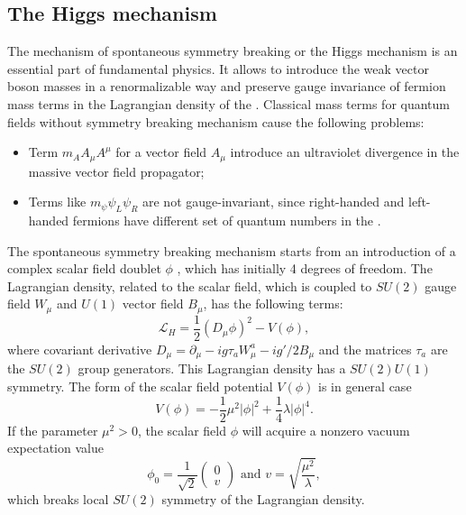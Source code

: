 \subsection{The Higgs mechanism}
\label{sec:Higgs_SM}
The mechanism of spontaneous symmetry breaking or the Higgs mechanism is an essential part of fundamental physics. It allows to introduce the weak vector boson masses in a renormalizable way and preserve gauge invariance of fermion mass terms in the Lagrangian density of the \sm. Classical mass terms for quantum fields without symmetry breaking mechanism cause the following problems:
\begin{itemize}
\item Term $m_A A_\mu A^\mu$ for a vector field $A_\mu$ introduce an ultraviolet divergence in the massive vector field propagator;
\item Terms like $m_\psi\psi_L \psi_R$ are not gauge-invariant, since right-handed and left-handed fermions have different set of quantum numbers in the \sm.
\end{itemize}

The spontaneous symmetry breaking mechanism starts from an introduction of a complex scalar field doublet $\phi$ , which has initially 4 degrees of freedom. 
The Lagrangian density, related to the scalar field, which is coupled to $SU(2)$ gauge field $W_\mu$ and $U(1)$ vector field $B_\mu$, has the following terms: 
\begin{equation}
	\mathcal{L}_{H} = \frac{1}{2}(D_\mu\phi)^2 - V(\phi),
    \label{formula:scalarLagrangian_1}
\end{equation}
where covariant derivative $D_\mu = \partial_\mu - i g \tau_a W^a_\mu - ig'/2 B_\mu$ and the matrices $\tau_a$ are the $SU(2)$ group generators. This Lagrangian density has a $SU(2) U(1)$ symmetry.
The form of the scalar field potential $V(\phi)$ is in general case 
\begin{equation}
    V(\phi) = -\frac{1}{2}\mu^2|\phi|^2 +  \frac{1}{4} \lambda |\phi|^4.
\end{equation}
If the parameter $\mu^2 > 0$, the scalar field $\phi$ will acquire a nonzero vacuum expectation value  %
\begin{equation}
\phi_0 = \frac{1}{\sqrt{2}}
\begin{pmatrix}
0\\v
\end{pmatrix} \text{ and } v = \sqrt{\frac{\mu^2}{\lambda}}, 
\end{equation}
which breaks local $SU(2)$ symmetry of the Lagrangian density. 

